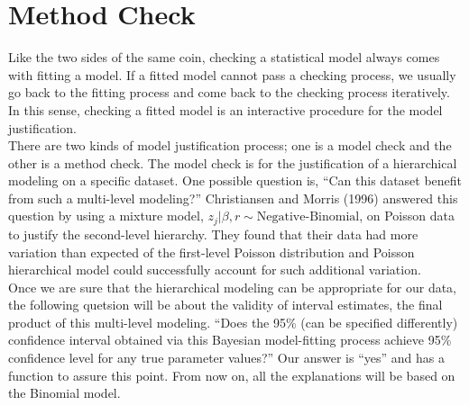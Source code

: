 \documentclass[article]{jss}
\begin{document}
\section[Method Check]{Method Check}
Like the two sides of the same coin, checking a statistical model always comes with fitting a model. If a fitted model cannot pass a checking process, we usually go back to the fitting process and come back to the checking process iteratively. In this sense, checking a fitted model is an interactive procedure for the model justification.
\\

There are two kinds of model justification process; one is a model check and the other is a method check. The model check is for the justification of a hierarchical modeling on a specific dataset. One possible question is, ``Can this dataset benefit from such a multi-level modeling?'' Christiansen and Morris (1996) answered this question by using a mixture model, $z_{j}\vert \beta, r\sim\textrm{Negative-Binomial}$, on Poisson data to justify the second-level hierarchy. They found that their data had more variation than expected of the first-level Poisson distribution and Poisson hierarchical model could successfully account for such additional variation.
\\

Once we are sure that the hierarchical modeling can be appropriate for our data, the following quetsion will be about the validity of interval estimates, the final product of this multi-level modeling. ``Does the 95\% (can be specified differently) confidence interval obtained via this Bayesian model-fitting process achieve 95\% confidence level  for any true parameter values?'' Our answer is ``yes'' and  has a function to assure this point. From now on, all the explanations will be based on the Binomial model.
\end{document}
